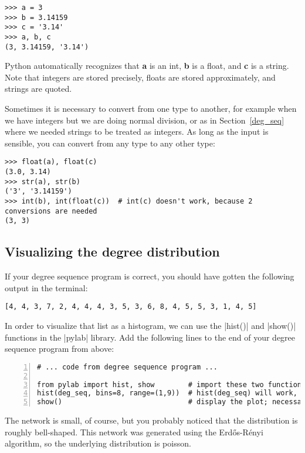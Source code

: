 \documentclass{article}
\begin{document}
\begin{Verbatim}[samepage=true]
>>> a = 3
>>> b = 3.14159
>>> c = '3.14'
>>> a, b, c
(3, 3.14159, '3.14')
\end{Verbatim}

Python automatically recognizes that \textbf{a} is an int, \textbf{b} is a float, and \textbf{c} is a string.  Note that integers are stored precisely,
floats are stored approximately, and strings are quoted.

Sometimes it is necessary to convert from one type to another, for example when we have integers but we are doing normal division, or as in Section~\ref{deg_seq}
where we needed strings to be treated as integers.  As long as the input is sensible, you can convert from any type to any other type:

\begin{Verbatim}[samepage=true]
>>> float(a), float(c)
(3.0, 3.14)
>>> str(a), str(b)
('3', '3.14159')
>>> int(b), int(float(c))  # int(c) doesn't work, because 2 conversions are needed
(3, 3)
\end{Verbatim}

\subsection{Visualizing the degree distribution}
If your degree sequence program is correct, you should have gotten the following output in the terminal:

\begin{Verbatim}
[4, 4, 3, 7, 2, 4, 4, 4, 3, 5, 3, 6, 8, 4, 5, 5, 3, 1, 4, 5]
\end{Verbatim}

In order to visualize that list as a histogram, we can use the |hist()| and |show()| functions in the |pylab| library.  Add the following lines to 
the end of your degree sequence program from above:

\begin{Verbatim}[numbers=left, samepage=true]
# ... code from degree sequence program ...

from pylab import hist, show        # import these two functions from the pylab library
hist(deg_seq, bins=8, range=(1,9))  # hist(deg_seq) will work, but not look very good
show()                              # display the plot; necessary with some pylab versions
\end{Verbatim}

The network is small, of course, but you probably noticed that the distribution is roughly bell-shaped.  This network was generated using the
Erd\H{o}s-R\'{e}nyi algorithm, so the underlying distribution is poisson.
\end{document}
